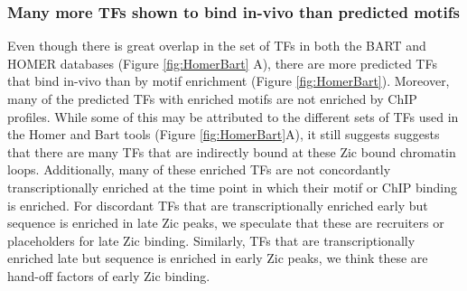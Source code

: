 \documentclass[fleqn,10pt,twocolumn]{wlscirep}
\begin{document}
\subsubsection*{Many more TFs shown to bind in-vivo than predicted motifs} 
Even though there is great overlap in the set of TFs in both the BART and HOMER databases (Figure \ref{fig:HomerBart} A), there are more predicted TFs that bind in-vivo than by motif enrichment (Figure \ref{fig:HomerBart}). Moreover, many of the predicted TFs with enriched motifs are not enriched by ChIP profiles. While some of this may be attributed to the different sets of TFs used in the Homer and Bart tools (Figure \ref{fig:HomerBart}A), it still suggests suggests that there are many TFs that are indirectly bound at these Zic bound chromatin loops. Additionally, many of these enriched TFs are not concordantly transcriptionally enriched at the time point in which their motif or ChIP binding is enriched. For discordant TFs that are transcriptionally enriched early but sequence is enriched in late Zic peaks, we speculate that these are recruiters or placeholders for late Zic binding. Similarly, TFs that are transcriptionally enriched late but sequence is enriched in early Zic peaks, we think these are hand-off factors of early Zic binding.
\end{document}
